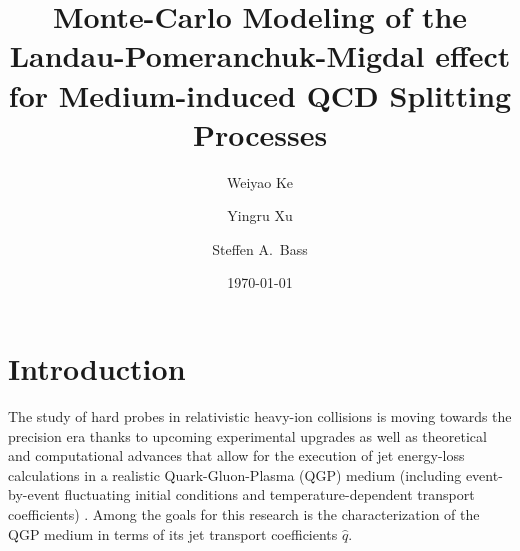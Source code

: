 \documentclass[aps, prc, reprint, amsmath, groupedaddress, nofootinbib]{revtex4-1}
\begin{document}
\title{Monte-Carlo Modeling of the Landau-Pomeranchuk-Migdal effect for Medium-induced QCD Splitting Processes}
\author{Weiyao Ke}
\author{Yingru Xu}
\author{Steffen A.\ Bass}
\date{\today}
\maketitle 

\section{Introduction}
The study of hard probes in relativistic heavy-ion collisions is moving towards the precision era thanks to upcoming experimental upgrades \cite{ATLAS-Collaboration:2012iwa,Abelevetal:2014dna,STAR:upgrade-hf,Adare:2015kwa,CMS:2017dec} as well as theoretical and computational advances that allow for the execution of jet energy-loss calculations in a realistic Quark-Gluon-Plasma (QGP) medium (including event-by-event fluctuating initial conditions and temperature-dependent transport coefficients) \cite{Wang:1994fx,Zakharov:1996fv,Baier:1996sk,Zakharov:1997uu,Arnold:2002zm,Gyulassy:2003mc,Kovner:2003zj,CasalderreySolana:2007pr,Bass:2008rv,Schenke:2009gb,Majumder:2009zu,Majumder:2010qh,Armesto:2011ht,Zapp:2011ya,Ovanesyan:2011xy,Kang:2014xsa,Cao:2016gvr,Kauder:2018cdt,Cao:2017zih}. Among the goals for this research is the characterization of the QGP medium in terms of its jet transport coefficients $\hat{q}$.
\end{document}
